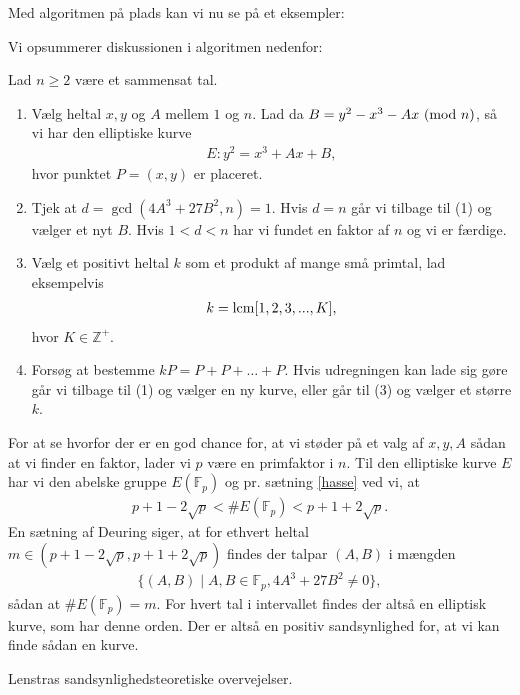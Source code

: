 Med algoritmen på plads kan vi nu se på et eksempler:




Vi opsummerer diskussionen i algoritmen nedenfor:

\begin{algorithm}
Lad $n \geq 2$ være et sammensat tal.
\begin{enumerate}
	\item Vælg heltal $x, y$ og $A$ mellem $1$ og $n$. Lad da $B = y^2 - x^3 - Ax \ (\mathrm{mod} \ n)$, så vi har den 	 
	elliptiske kurve
	\begin{align*}
		E : y^2 = x^3 + Ax + B, 
	\end{align*}
	hvor punktet $P=(x, y)$ er placeret.
	\item Tjek at $d = \gcd(4A^3 + 27B^2, n) = 1$. Hvis $d=n$ går vi tilbage
	til (1) og vælger et nyt $B$. Hvis $1 < d < n$ har vi fundet en faktor af $n$ og vi er færdige.
	\item Vælg et positivt heltal $k$ som et produkt af mange små primtal, lad eksempelvis
	\begin{align*}
		k = \mathrm{lcm}[1, 2, 3, ..., K],
	\end{align*}
	hvor $K \in \mathbb{Z}^+$.
	\item Forsøg at bestemme $kP = P + P + \ldots + P$. Hvis udregningen kan lade sig gøre går vi tilbage til (1) og 
	vælger en ny kurve, eller går til (3) og vælger et større $k$.
\end{enumerate}
\end{algorithm}
For at se hvorfor der er en god chance for, at vi støder på et valg af $x, y, A$ sådan at vi finder en faktor, lader vi $p$ være en primfaktor i $n$. Til den elliptiske kurve $E$ har vi den abelske gruppe $E(\mathbb{F}_p)$ og pr. sætning \ref{hasse} ved vi, at
\begin{align*}
	p + 1 - 2 \sqrt{p} < \#E(\mathbb{F}_p) < p + 1 + 2 \sqrt{p}.
\end{align*} 
En sætning af Deuring \cite{Deuring} siger, at for ethvert heltal $m \in (p+1-2\sqrt{p}, p+1+2\sqrt{p})$ findes der talpar $(A, B)$ i mængden
\begin{align*}
	\{ (A, B) \mid A, B \in \mathbb{F}_p, 4A^3 +27B^2 \neq 0 \},
\end{align*}
sådan at $\#E(\mathbb{F}_p) = m$. For hvert tal i intervallet findes der altså en elliptisk kurve, som har denne orden. Der er altså en positiv sandsynlighed for, at vi kan finde sådan en kurve.

Lenstras sandsynlighedsteoretiske overvejelser.

